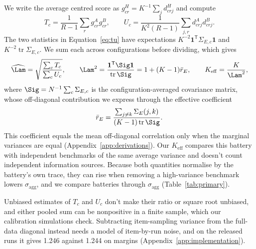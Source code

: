 We write the average centred score as $g^H_{cr}=K^{-1}\sum_j d^H_{crj}$ and compute
\begin{equation}
T_c=\frac{1}{R-1}\sum_r g^A_{cr}g^B_{cr},\qquad
U_c=\frac{1}{K^2(R-1)}\sum_{j,r}d^A_{crj}d^B_{crj}.
\label{eq:tu}
\end{equation}
The two statistics in Equation~\ref{eq:tu} have expectations $K^{-2}\mathbf{1}^{\mathsf T}\Sigma_{E,c}\mathbf{1}$ and $K^{-2}\operatorname{tr}\Sigma_{E,c}$. We sum each across configurations before dividing, which gives
\begin{equation}
\widehat\Lam=\sqrt{\frac{\sum_c T_c}{\sum_c U_c}},\qquad
\Lam^2=\frac{\mathbf{1}^{\mathsf T}\Sig\mathbf{1}}{\operatorname{tr}\Sig}
=1+(K-1)\bar r_E,\qquad K_{\mathrm{eff}}=\frac{K}{\Lam^2},
\label{eq:lambda}
\end{equation}
where $\Sig=N^{-1}\sum_c\Sigma_{E,c}$ is the configuration-averaged covariance matrix, whose off-diagonal contribution we express through the effective coefficient
\begin{equation}
\bar r_E=\frac{\sum_{j\ne k}\Sigma_E(j,k)}{(K-1)\operatorname{tr}\Sig}.
\label{eq:effective}
\end{equation}
This coefficient equals the mean off-diagonal correlation only when the marginal variances are equal (Appendix~\ref{app:derivations}). Our $K_{\mathrm{eff}}$ compares this battery with independent benchmarks of the same average variance and doesn't count independent information sources. Because both quantities normalise by the battery's own trace, they can rise when removing a high-variance benchmark lowers $\sigma_{\mathrm{agg}}$, and we compare batteries through $\sigma_{\mathrm{agg}}$ (Table~\ref{tab:primary}).

Unbiased estimates of $T_c$ and $U_c$ don't make their ratio or square root unbiased, and either pooled sum can be nonpositive in a finite sample, which our calibration simulations check. Subtracting item-sampling variance from the full-data diagonal instead needs a model of item-by-run noise, and on the released runs it gives 1.246  against 1.244 on margins (Appendix~\ref{app:implementation}).

